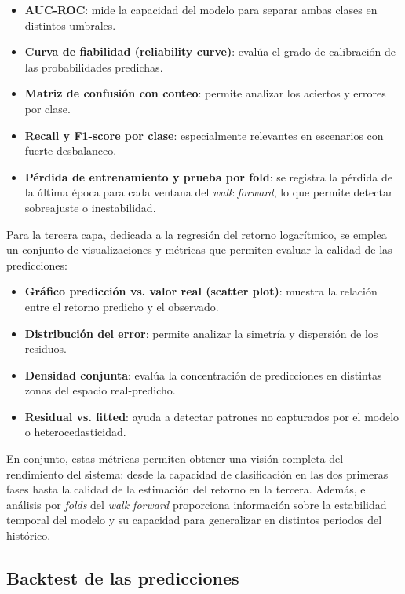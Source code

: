 \begin{itemize}
    \item \textbf{AUC-ROC}: mide la capacidad del modelo para separar ambas clases en distintos umbrales.
    \item \textbf{Curva de fiabilidad (reliability curve)}: evalúa el grado de calibración de las probabilidades predichas.
    \item \textbf{Matriz de confusión con conteo}: permite analizar los aciertos y errores por clase.
    \item \textbf{Recall y F1-score por clase}: especialmente relevantes en escenarios con fuerte desbalanceo.
    \item \textbf{Pérdida de entrenamiento y prueba por fold}: se registra la pérdida de la última época para cada ventana del \textit{walk forward},
    lo que permite detectar sobreajuste o inestabilidad.
\end{itemize}

Para la tercera capa, dedicada a la regresión del retorno logarítmico, se emplea un conjunto de visualizaciones y métricas que permiten evaluar la
calidad de las predicciones:

\begin{itemize}
    \item \textbf{Gráfico predicción vs. valor real (scatter plot)}: muestra la relación entre el retorno predicho y el observado.
    \item \textbf{Distribución del error}: permite analizar la simetría y dispersión de los residuos.
    \item \textbf{Densidad conjunta}: evalúa la concentración de predicciones en distintas zonas del espacio real-predicho.
    \item \textbf{Residual vs. fitted}: ayuda a detectar patrones no capturados por el modelo o heterocedasticidad.
\end{itemize}

En conjunto, estas métricas permiten obtener una visión completa del rendimiento del sistema: desde la capacidad de clasificación en las dos primeras
fases hasta la calidad de la estimación del retorno en la tercera. Además, el análisis por \textit{folds} del \textit{walk forward} proporciona
información sobre la estabilidad temporal del modelo y su capacidad para generalizar en distintos periodos del histórico.

\subsection{Backtest de las predicciones}

